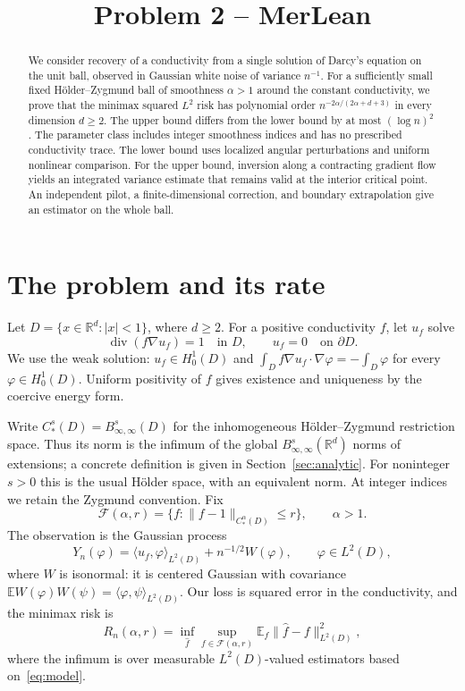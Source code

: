 \documentclass[11pt]{article}
\title{Problem 2 -- MerLean}
\author{}
\date{}
\theoremstyle{remark}
\newcommand{\R}{\mathbb R}
\newcommand{\E}{\mathbb E}
\newcommand{\cF}{\mathcal F}
\newcommand{\diver}{\operatorname{div}}
\newcommand{\norm}[1]{\lVert #1\rVert}
\newcommand{\abs}[1]{\lvert #1\rvert}
\newcommand{\ip}[2]{\langle #1,#2\rangle}
\begin{document}
\maketitle

\begin{abstract}
We consider recovery of a conductivity from a single solution of Darcy's equation on the unit ball, observed in Gaussian white noise of variance $n^{-1}$. For a sufficiently small fixed H\"older--Zygmund ball of smoothness $\alpha>1$ around the constant conductivity, we prove that the minimax squared $L^2$ risk has polynomial order $n^{-2\alpha/(2\alpha+d+3)}$ in every dimension $d\ge2$. The upper bound differs from the lower bound by at most $(\log n)^2$. The parameter class includes integer smoothness indices and has no prescribed conductivity trace. The lower bound uses localized angular perturbations and uniform nonlinear comparison. For the upper bound, inversion along a contracting gradient flow yields an integrated variance estimate that remains valid at the interior critical point. An independent pilot, a finite-dimensional correction, and boundary extrapolation give an estimator on the whole ball.
\end{abstract}

\section{The problem and its rate}
Let $D=\{x\in\R^d:\abs{x}<1\}$, where $d\ge2$. For a positive conductivity $f$, let $u_f$ solve
\begin{equation}\label{eq:pde}
 \diver(f\nabla u_f)=1\quad\text{in }D,
 \qquad u_f=0\quad\text{on }\partial D.
\end{equation}
We use the weak solution: $u_f\in H_0^1(D)$ and
$\int_D f\nabla u_f\cdot\nabla\varphi=-\int_D\varphi$ for every $\varphi\in H_0^1(D)$.
Uniform positivity of $f$ gives existence and uniqueness by the coercive energy form.

Write $C_*^s(D)=B^s_{\infty,\infty}(D)$ for the inhomogeneous H\"older--Zygmund restriction space. Thus its norm is the infimum of the global $B^s_{\infty,\infty}(\R^d)$ norms of extensions; a concrete definition is given in Section~\ref{sec:analytic}. For noninteger $s>0$ this is the usual H\"older space, with an equivalent norm. At integer indices we retain the Zygmund convention. Fix
\begin{equation}\label{eq:class}
 \cF(\alpha,r)=\{f:\norm{f-1}_{C_*^\alpha(D)}\le r\},
 \qquad \alpha>1.
\end{equation}
The observation is the Gaussian process
\begin{equation}\label{eq:model}
 Y_n(\varphi)=\ip{u_f}{\varphi}_{L^2(D)}+n^{-1/2}W(\varphi),
 \qquad \varphi\in L^2(D),
\end{equation}
where $W$ is isonormal: it is centered Gaussian with covariance
$\E W(\varphi)W(\psi)=\ip{\varphi}{\psi}_{L^2(D)}$.
Our loss is squared error in the conductivity, and the minimax risk is
\[
 R_n(\alpha,r)=\inf_{\widehat f}\sup_{f\in\cF(\alpha,r)}
 \E_f\norm{\widehat f-f}_{L^2(D)}^2,
\]
where the infimum is over measurable $L^2(D)$-valued estimators based on~\eqref{eq:model}.
\end{document}
